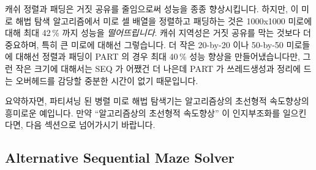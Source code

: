 \fi

캐쉬 정렬과 패딩은 거짓 공유를 줄임으로써 성능을 종종 향상시킵니다.
하지만, 이 미로 해법 탐색 알고리즘에서 미로 셀 배열을 정렬하고 패딩하는 것은
1000x1000 미로에 대해 최대 42\,\% 까지 성능을 \emph{떨어뜨립니다}.
캐쉬 지역성은 거짓 공유를 막는 것보다 더 중요하며, 특히 큰 미로에 대해선
그렇습니다.
더 작은 20-by-20 이나 50-by-50 미로들에 대해선 정렬과 패딩이 PART 의 경우 최대
40\,\% 성능 향상을 만들어냈습니다만, 그런 작은 크기에 대해서는 SEQ 가 어쨌건 더
나은데 PART 가 쓰레드생성과 정리에 드는 오버헤드를 감당할 중분한 시간이 없기
때문입니다.

요약하자면, 파티셔닝 된 병렬 미로 해법 탐색기는 알고리즘상의 초선형적
속도향상의 흥미로운 예입니다.
만약 ``알고리즘상의 초선형적 속도향상'' 이 인지부조화를 일으킨다면, 다음
섹션으로 넘어가시기 바랍니다.

\subsection{Alternative Sequential Maze Solver}
\label{sec:SMPdesign:Alternative Sequential Maze Solver}

